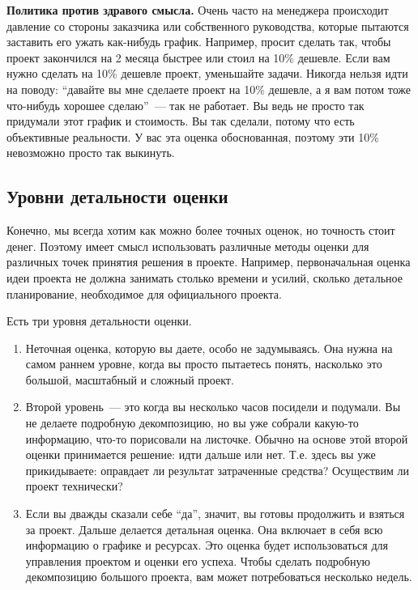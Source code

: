 \documentclass{../../text-style}
\begin{document}
\textbf{Политика против здравого смысла.} Очень часто на менеджера происходит давление со стороны заказчика или собственного руководства, которые пытаются заставить его ужать как-нибудь график. Например, просит сделать так, чтобы проект закончился на 2 месяца быстрее или стоил на 10\% дешевле. Если вам нужно сделать на 10\% дешевле проект, уменьшайте задачи. Никогда нельзя идти на поводу: \enquote{давайте вы мне сделаете проект на 10\% дешевле, а я вам потом тоже что-нибудь хорошее сделаю}~--- так не работает. Вы ведь не просто так придумали этот график и стоимость. Вы так сделали, потому что есть объективные реальности. У вас эта оценка обоснованная, поэтому эти 10\% невозможно просто так выкинуть.

\subsection{Уровни детальности оценки}

Конечно, мы всегда хотим как можно более точных оценок, но точность стоит денег. Поэтому имеет смысл использовать различные методы оценки для различных точек принятия решения в проекте. Например, первоначальная оценка идеи проекта не должна занимать столько времени и усилий, сколько детальное планирование, необходимое для официального проекта.

Есть три уровня детальности оценки.

\begin{enumerate}
    \item Неточная оценка, которую вы даете, особо не задумываясь. Она нужна на самом раннем уровне, когда вы просто пытаетесь понять, насколько это большой, масштабный и сложный проект.
    \item Второй уровень~--- это когда вы несколько часов посидели и подумали. Вы не делаете подробную декомпозицию, но вы уже собрали какую-то информацию, что-то порисовали на листочке. Обычно на основе этой второй оценки принимается решение: идти дальше или нет. Т.е. здесь вы уже прикидываете: оправдает ли результат затраченные средства? Осуществим ли проект технически?
    \item Если вы дважды сказали себе \enquote{да}, значит, вы готовы продолжить и взяться за проект. Дальше делается детальная оценка. Она включает в себя всю информацию о графике и ресурсах. Это оценка будет использоваться для управления проектом и оценки его успеха. Чтобы сделать подробную декомпозицию большого проекта, вам может потребоваться несколько недель.
\end{enumerate}
\end{document}
